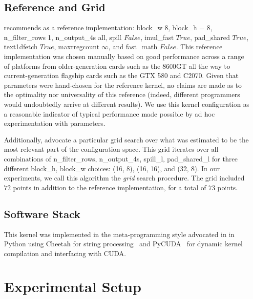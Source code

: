 \documentclass{sig-alternate}
\begin{document}
\subsection{Reference and Grid}
\label{sec:refgrid}

\cite{pinto+cox:2011gcg} recommends as a reference implementation: block\_w 8, 
block\_h = 8, n\_filter\_rows 1, n\_output\_4s all, spill $False$, imul\_fast $True$,
pad\_shared $True$, 
text1dfetch $True$,
maxrregcount $\infty$,
and fast\_math $False$.
This reference implementation was chosen manually based on good performance across a range of platforms from older-generation
cards such as the
8600GT all the way to
current-generation flagship cards such as the GTX 580 and C2070.
Given that parameters were hand-chosen for the reference kernel, no claims are
made as to the optimality nor universality of this reference (indeed, different
programmers would undoubtedly arrive at different results).  We use this
kernel configuration as a reasonable indicator of typical performance
made possible by ad hoc experimentation with parameters.

Additionally, \cite{pinto+cox:2011gcg} advocate a particular grid search over
what was estimated to be the most relevant part of the configuration space.
This grid iterates over all
combinations of n\_filter\_rows, n\_output\_4s, spill\_l, pad\_shared\_l for three different block\_h, block\_w choices: (16, 8), (16, 16), and (32, 8).
In our experiments, we call this algorithm the {\em grid} search procedure.
The grid included $72$ points in addition to the reference implementation, for a total of $73$ points.

\subsection{Software Stack}

This kernel was implemented in the meta-programming style advocated
in \citet{pinto+cox:2011gcg} in Python using
Cheetah for string processing~\citep{cheetah}
and PyCUDA~\citep{klochner+etal:2009} for dynamic kernel
compilation and interfacing with CUDA.


\section{Experimental Setup}
\end{document}
